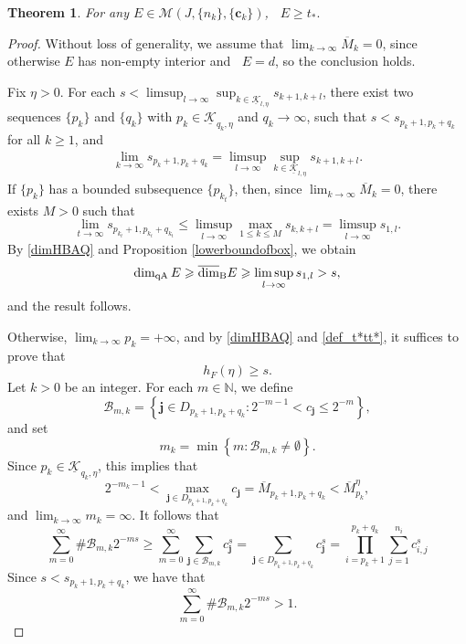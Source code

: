 \documentclass[12pt]{amsart}
\numberwithin{equation}{section}
\theoremstyle{plain}
\newtheorem{theorem}{Theorem}[section]
\theoremstyle{remark}
\theoremstyle{definition}
\newcommand{\uk}{\underline{\mathcal{K}}}
\newcommand{\om}{\overline{M}}
\newcommand{\N}{\mathbb{N}}
\newcommand{\jjj}{\mathbf{j}}
\newcommand{\ccc}{\mathbf{c}}
\newcommand{\uc}{\underline{c}}
\renewcommand{\ge}{\geqslant}
\renewcommand{\le}{\leqslant}
\renewcommand{\geq}{\geqslant}
\DeclareMathOperator{\dimqa}{dim_{qA}}
\begin{document}
	\begin{theorem}\label{dayu}
For any $E\in \mathcal{M}(J,\{n_k\},\{\ccc_k\})$,  $\dimqa E\ge  t_*.$
	\end{theorem}
	\begin{proof}%
		Without loss of generality, we assume that $\lim_{k\to\infty} \om_k = 0$, since otherwise $E$ has non-empty interior and $\dimqa E = d$, so the conclusion holds.
		
Fix $\eta>0$. For each $s < \limsup_{l \to \infty} \sup_{k \in \uk_{l,\eta}} s_{k+1,k+l}$, there exist two sequences $\{p_k\}$ and $\{q_k\}$ with $p_k \in \uk_{q_k,\eta}$ and $q_k \to \infty$, such that $s < s_{p_k+1,p_k+q_k}$ for all $k \ge 1$, and 
		\begin{gather*}
			\lim_{k\to\infty}s_{p_k+1,p_k+q_k}= \limsup_{l\to\infty}\sup_{k\in \uk_{l,\eta}} s_{k+1,k+l}.
		\end{gather*}
If $\{p_k\}$ has a bounded subsequence $\{p_{k_t}\}$, then, since $\lim_{k \to \infty} \om_k = 0$, there exists $M>0$ such that
		\[
		\lim_{t\to\infty} s_{p_{k_t}+1,p_{k_t}+q_{k_t}}\le  \limsup_{l\to\infty}\max_{1\le k\le M} s_{k,k+l}=\limsup_{l\to\infty} s_{1,l}.
		\]
		By \eqref{dimHBAQ} and Proposition \ref{lowerboundofbox}, we obtain
		\[
		\dimqa E\ge \overline{\text{dim}}_{\rm B}E\ge \limsup_{l\to\infty} s_{1,l}> s,
		\]
	and the result follows.
		
		
	 Otherwise, $\lim_{k \to \infty} p_k = +\infty$, and by \eqref{dimHBAQ} and \eqref{def_t*tt*}, it suffices to prove that
$$
h_F(\eta) \geq s. 
$$
Let $k > 0$ be an integer. For each $m \in \N$, we define
		\[
		\mathcal{B}_{m,k}=\left\{\jjj\in D_{p_k+1,p_k+q_k}:2^{-m-1}<c_{\jjj}\le 2^{-m}\right\},
		\]
		and set
		\[
		m_k=\min\left\{m:\mathcal{B}_{m,k}\neq \emptyset\right\}.
		\]
		Since $p_k \in \uk_{q_k,\eta}$, this implies that
\begin{equation}\label{M/M}
				2^{-m_k-1}<\max_{\jjj\in D_{p_k+1,p_k+q_k}}c_{\jjj}
				=\om_{p_k+1,p_k+q_k} <\om_{p_k}^\eta,
		\end{equation}
		and  $	\lim_{k\to\infty}m_k=\infty. $
		It follows that 
		$$
		\sum_{m=0}^{\infty}\#\mathcal{B}_{m,k}2^{-ms}\ge  \sum_{m=0}^{\infty}\sum_{\jjj\in\mathcal{B}_{m,k}}c_{\jjj}^s =\sum_{\jjj\in D_{p_k+1,p_k+q_k}}c_{\jjj}^s =\prod_{i=p_k+1}^{p_k+q_k}\sum_{j=1}^{n_i}c_{i,j}^s
		$$
		Since   $s<s_{p_k+1,p_k+q_k}$, we have that 
		\begin{equation} \label{numberofB}
			\sum_{m=0}^{\infty}\#\mathcal{B}_{m,k}2^{-ms} >1.
		\end{equation}
		

\end{proof}
\end{document}
